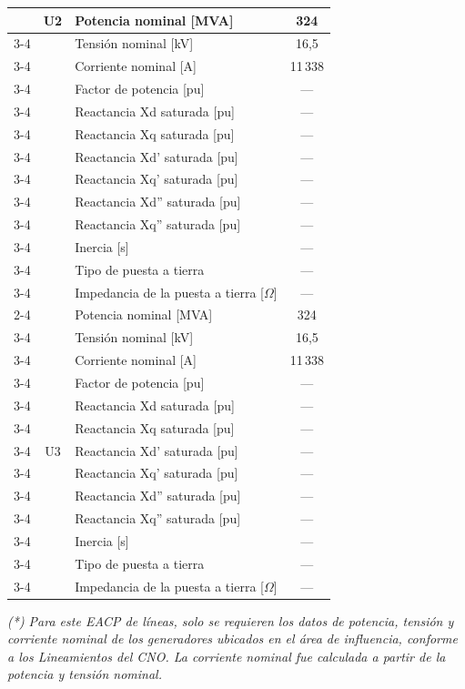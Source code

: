 \documentclass[12pt]{article}
\begin{document}
\begin{center}
\begin{tabular}{|c|c|p{6.0cm}|c|}
&
\multirow{13}{*}{\centering U2}
& Potencia nominal [MVA] & 324 \\ \cline{3-4}
& & Tensión nominal [kV] & 16,5 \\ \cline{3-4}
& & Corriente nominal [A] & 11\,338 \\ \cline{3-4}
& & Factor de potencia [pu] & --- \\ \cline{3-4}
& & Reactancia Xd saturada [pu] & --- \\ \cline{3-4}
& & Reactancia Xq saturada [pu] & --- \\ \cline{3-4}
& & Reactancia Xd' saturada [pu] & --- \\ \cline{3-4}
& & Reactancia Xq' saturada [pu] & --- \\ \cline{3-4}
& & Reactancia Xd'' saturada [pu] & --- \\ \cline{3-4}
& & Reactancia Xq'' saturada [pu] & --- \\ \cline{3-4}
& & Inercia [s] & --- \\ \cline{3-4}
& & Tipo de puesta a tierra & --- \\ \cline{3-4}
& & Impedancia de la puesta a tierra [$\Omega$] & --- \\ \cline{2-4}

&
\multirow{13}{*}{\centering U3}
& Potencia nominal [MVA] & 324 \\ \cline{3-4}
& & Tensión nominal [kV] & 16,5 \\ \cline{3-4}
& & Corriente nominal [A] & 11\,338 \\ \cline{3-4}
& & Factor de potencia [pu] & --- \\ \cline{3-4}
& & Reactancia Xd saturada [pu] & --- \\ \cline{3-4}
& & Reactancia Xq saturada [pu] & --- \\ \cline{3-4}
& & Reactancia Xd' saturada [pu] & --- \\ \cline{3-4}
& & Reactancia Xq' saturada [pu] & --- \\ \cline{3-4}
& & Reactancia Xd'' saturada [pu] & --- \\ \cline{3-4}
& & Reactancia Xq'' saturada [pu] & --- \\ \cline{3-4}
& & Inercia [s] & --- \\ \cline{3-4}
& & Tipo de puesta a tierra & --- \\ \cline{3-4}
& & Impedancia de la puesta a tierra [$\Omega$] & --- \\ \hline

\end{tabular}

\vspace{3mm}

\begin{minipage}{0.90\textwidth}
\footnotesize
\textit{(*) Para este EACP de líneas, solo se requieren los datos de potencia,
tensión y corriente nominal de los generadores ubicados en el área de
influencia, conforme a los Lineamientos del CNO. La corriente nominal fue
calculada a partir de la potencia y tensión nominal.}
\end{minipage}

\end{center}
\end{document}
